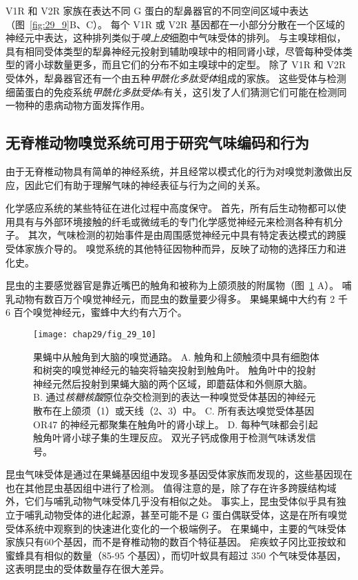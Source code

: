 V1R 和 V2R 家族在表达不同 G 蛋白的犁鼻器官的不同空间区域中表达（图~\ref{fig:29_9}B、C）。
每个 V1R 或 V2R 基因都在一小部分分散在一个区域的神经元中表达，这种排列类似于\textit{嗅上皮}细胞中气味受体的排列。
与主嗅球相似，具有相同受体类型的犁鼻神经元投射到辅助嗅球中的相同肾小球，尽管每种受体类型的肾小球数量更多，而且它们的分布不如主嗅球中的定型。
除了 V1R 和 V2R 受体外，犁鼻器官还有一个由五种\textit{甲酰化多肽受体}组成的家族。
这些受体与检测细菌蛋白的免疫系统\textit{甲酰化多肽受体}s有关，这引发了人们猜测它们可能在检测同一物种的患病动物方面发挥作用。



\subsection{无脊椎动物嗅觉系统可用于研究气味编码和行为}

由于无脊椎动物具有简单的神经系统，并且经常以模式化的行为对嗅觉刺激做出反应，因此它们有助于理解气味的神经表征与行为之间的关系。


化学感应系统的某些特征在进化过程中高度保守。
首先，所有后生动物都可以使用具有与外部环境接触的纤毛或微绒毛的专门化学感觉神经元来检测各种有机分子。 
其次，气味检测的初始事件是由周围感觉神经元中具有特定表达模式的跨膜受体家族介导的。
嗅觉系统的其他特征因物种而异，反映了动物的选择压力和进化史。


昆虫的主要感觉器官是靠近嘴巴的触角和被称为上颌须肢的附属物（图~\ref{fig:29_10} A）。
哺乳动物有数百万个嗅觉神经元，而昆虫的数量要少得多。
果蝇果蝇中大约有 2 千 6 百个嗅觉神经元，蜜蜂中大约有六万个。


\begin{figure}[htbp]
	\centering
	\texttt{[image: chap29/fig\_29\_10]}
	\caption{果蝇中从触角到大脑的嗅觉通路。
		A. 触角和上颌触须中具有细胞体和树突的嗅觉神经元的轴突将轴突投射到触角叶。
		触角叶中的投射神经元然后投射到果蝇大脑的两个区域，即蘑菇体和外侧原大脑。
		B. 通过\textit{核糖核酸}原位杂交检测到的表达一种嗅觉受体基因的神经元散布在上颌须（1）或天线（2、3）中。
		C. 所有表达嗅觉受体基因 OR47 的神经元都聚集在触角叶的肾小球上。
		D. 每种气味都会引起触角叶肾小球子集的生理反应。
		双光子钙成像用于检测气味诱发信号。}
	\label{fig:29_10}
\end{figure}


昆虫气味受体是通过在果蝇基因组中发现多基因受体家族而发现的，这些基因现在也在其他昆虫基因组中进行了检测。
值得注意的是，除了存在许多跨膜结构域外，它们与哺乳动物气味受体几乎没有相似之处。
事实上，昆虫受体似乎具有独立于哺乳动物受体的进化起源，甚至可能不是 G 蛋白偶联受体，这是在所有嗅觉受体系统中观察到的快速进化变化的一个极端例子。
在果蝇中，主要的气味受体家族只有60个基因，而不是脊椎动物的数百个特征基因。
疟疾蚊子冈比亚按蚊和蜜蜂具有相似的数量（85-95 个基因），而切叶蚁具有超过 350 个气味受体基因，这表明昆虫的受体数量存在很大差异。


